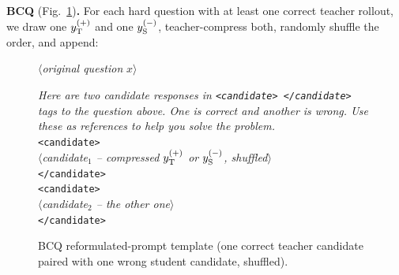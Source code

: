 \documentclass{llmxive}
\begin{document}
\noindent\textbf{BCQ} (Fig.~\ref{fig:prompt-bcq})\textbf{.} For each hard question with at least one correct teacher rollout, we draw one $y_{\rm T}^{(+)}$ and one $y_{\rm S}^{(-)}$, teacher-compress both, randomly shuffle the order, and append:
\begin{figure}[!htbp]
\begin{prompttemplatefig}
\small
$\langle$\emph{original question} $x$$\rangle$

\emph{Here are two candidate responses in \texttt{<candidate> </candidate>} tags to the question above. One is correct and another is wrong. Use these as references to help you solve the problem.}\\
\texttt{<candidate>}\\
$\langle$\emph{candidate$_1$ -- compressed $y_{\rm T}^{(+)}$ or $y_{\rm S}^{(-)}$, shuffled}$\rangle$\\
\texttt{</candidate>}\\
\texttt{<candidate>}\\
$\langle$\emph{candidate$_2$ -- the other one}$\rangle$\\
\texttt{</candidate>}
\end{prompttemplatefig}
\caption{BCQ reformulated-prompt template (one correct teacher candidate paired with one wrong student candidate, shuffled).}
\label{fig:prompt-bcq}
\end{figure}
\end{document}
